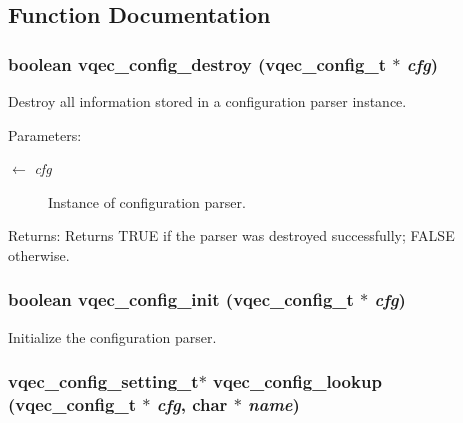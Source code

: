 \subsection{Function Documentation}
\subsubsection{\setlength{\rightskip}{0pt plus 5cm}boolean vqec\_\-config\_\-destroy (\bf{vqec\_\-config\_\-t} $\ast$ {\em cfg})}\label{vqec__config__parser_8h_868fff1775cba2f5be5a20d6805b7f7e}


Destroy all information stored in a configuration parser instance.

\begin{Desc}
\item[Parameters:]
\begin{description}
\item[\mbox{$\leftarrow$} {\em cfg}]Instance of configuration parser. \end{description}
\end{Desc}
\begin{Desc}
\item[Returns:]Returns TRUE if the parser was destroyed successfully; FALSE otherwise. \end{Desc}
\subsubsection{\setlength{\rightskip}{0pt plus 5cm}boolean vqec\_\-config\_\-init (\bf{vqec\_\-config\_\-t} $\ast$ {\em cfg})}\label{vqec__config__parser_8h_ead34c321a08f14454b9c0b3faa1d94f}


Initialize the configuration parser. 
\subsubsection{\setlength{\rightskip}{0pt plus 5cm}\bf{vqec\_\-config\_\-setting\_\-t}$\ast$ vqec\_\-config\_\-lookup (\bf{vqec\_\-config\_\-t} $\ast$ {\em cfg}, char $\ast$ {\em name})}\label{vqec__config__parser_8h_c5fb9837424d9e9dd06cc152476a80de}


